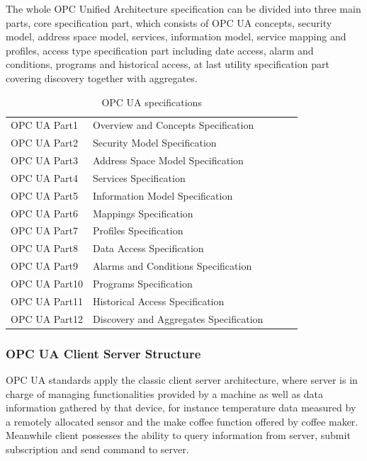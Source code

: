 \documentclass[]{llncs}
\begin{document}
The whole OPC Unified Architecture specification can be divided into three main parts, core specification part, which consists of OPC UA concepts, security model, address space model, services, information model, service mapping and profiles, access type specification part including date access, alarm and conditions, programs and historical access, at last utility specification part covering discovery together with aggregates.
\begin{table}[!htbp]
\caption{OPC UA specifications}
\centering
\begin{tabular}{lllll}
\hline\hline
OPC UA Part1 &Overview and Concepts Specification \\
OPC UA Part2 &Security Model Specification \\
OPC UA Part3 &Address Space Model Specification\\
OPC UA Part4 &Services Specification\\
OPC UA Part5 &Information Model Specification  \\
OPC UA Part6 &Mappings Specification \\
OPC UA Part7 &Profiles Specification \\
OPC UA Part8 &Data Access Specification  \\
OPC UA Part9 &Alarms and Conditions Specification \\
OPC UA Part10 &Programs Specification  \\
OPC UA Part11 &Historical Access Specification \\
OPC UA Part12 &Discovery and Aggregates Specification \\
\hline
\end{tabular}
\label{table:opcua}
\end{table}

\subsubsection{OPC UA Client Server Structure}
OPC UA standards apply the classic client server architecture, where server is in charge of managing functionalities provided by a machine as well as data information gathered by that device, for instance temperature data measured by  a remotely allocated sensor and the make coffee function offered by coffee maker. Meanwhile client possesses the ability to query information from server, submit subscription and send command to server.
\end{document}
